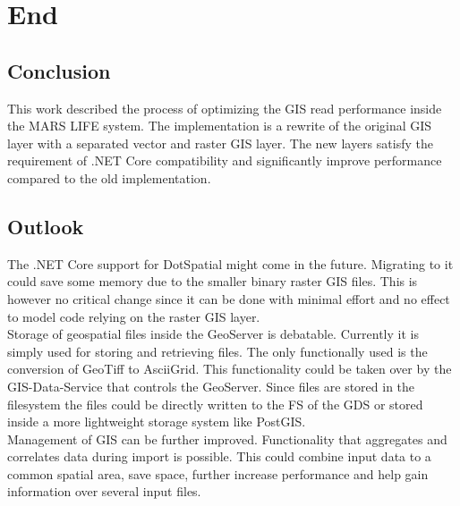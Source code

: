 
\chapter{End}



\section{Conclusion}
This work described the process of optimizing the GIS read performance inside the MARS LIFE system. The implementation is a rewrite of the original GIS layer with a separated vector and raster GIS layer. The new layers satisfy the requirement of .NET Core compatibility and significantly improve performance compared to the old implementation.


\section{Outlook}
The .NET Core support for DotSpatial might come in the future. Migrating to it could save some memory due to the smaller binary raster GIS files. This is however no critical change since it can be done with minimal effort and no effect to model code relying on the raster GIS layer.\\
Storage of geospatial files inside the GeoServer is debatable. Currently it is simply used for storing and retrieving files. The only functionally used is the conversion of GeoTiff to AsciiGrid. This functionality could be taken over by the GIS-Data-Service that controls the GeoServer. Since files are stored in the filesystem the files could be directly written to the FS of the GDS or stored inside a more lightweight storage system like PostGIS.\\
Management of GIS can be further improved. Functionality that aggregates and correlates data during import is possible. This could combine input data to a common spatial area, save space, further increase performance and help gain information over several input files.